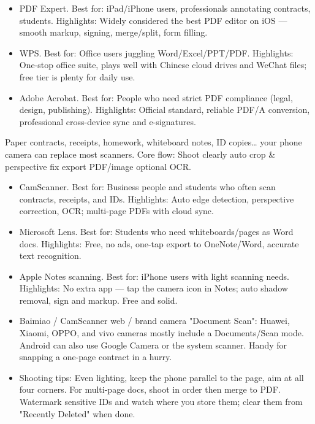 
\begin{itemize}
  \item PDF Expert. Best for: iPad/iPhone users, professionals annotating contracts, students. Highlights: Widely considered the best PDF editor on iOS — smooth markup, signing, merge/split, form filling.
  \item WPS. Best for: Office users juggling Word/Excel/PPT/PDF. Highlights: One-stop office suite, plays well with Chinese cloud drives and WeChat files; free tier is plenty for daily use.
  \item Adobe Acrobat. Best for: People who need strict PDF compliance (legal, design, publishing). Highlights: Official standard, reliable PDF/A conversion, professional cross-device sync and e-signatures.
\end{itemize}


Paper contracts, receipts, homework, whiteboard notes, ID copies… your phone camera can replace most scanners. Core flow: Shoot clearly auto crop \& perspective fix export PDF/image optional OCR.

\begin{itemize}
  \item CamScanner. Best for: Business people and students who often scan contracts, receipts, and IDs. Highlights: Auto edge detection, perspective correction, OCR; multi-page PDFs with cloud sync.
  \item Microsoft Lens. Best for: Students who need whiteboards/pages as Word docs. Highlights: Free, no ads, one-tap export to OneNote/Word, accurate text recognition.
  \item Apple Notes scanning. Best for: iPhone users with light scanning needs. Highlights: No extra app — tap the camera icon in Notes; auto shadow removal, sign and markup. Free and solid.
  \item Baimiao / CamScanner web / brand camera "Document Scan": Huawei, Xiaomi, OPPO, and vivo cameras mostly include a Documents/Scan mode. Android can also use Google Camera or the system scanner. Handy for snapping a one-page contract in a hurry.
  \item Shooting tips: Even lighting, keep the phone parallel to the page, aim at all four corners. For multi-page docs, shoot in order then merge to PDF. Watermark sensitive IDs and watch where you store them; clear them from "Recently Deleted" when done.
\end{itemize}

